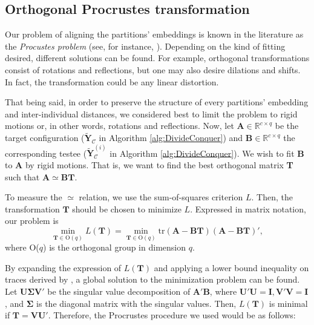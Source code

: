 \subsection{Orthogonal Procrustes transformation}
\label{sec:Procrustes}

Our problem of aligning the partitions' embeddings is known in the literature as the \textit{Procustes problem} (see, for instance, \citet{Borg2005}). Depending on the kind of fitting desired, different solutions can be found. For example, orthogonal transformations consist of rotations and reflections, but one may also desire dilations and shifts. In fact, the transformation could be any linear distortion.

That being said, in order to preserve the structure of every partitions' embedding and inter-individual distances, we considered best to limit the problem to rigid motions or, in other words, rotations and reflections. Now, let $\mathbf{A} \in \mathbb{R}^{c \times q}$ be the target configuration ($\mathbf{\tilde{Y}}_{\mathcal{C}}$ in Algorithm \ref{alg:DivideConquer}) and $\mathbf{B} \in \mathbb{R}^{c \times q}$ the corresponding testee ($\mathbf{\tilde{Y}}_{\mathcal{C}}^{(i)}$ in Algorithm \ref{alg:DivideConquer}). We wish to fit \textbf{B} to \textbf{A} by rigid motions. That is, we want to find the best orthogonal matrix \textbf{T} such that $\mathbf{A} \simeq \mathbf{BT}$.

To measure the $\simeq$ relation, we use the sum-of-squares criterion $L$. Then, the transformation $\mathbf{T}$ should be chosen to minimize $L$. Expressed in matrix notation, our problem is
$$
\min_{\mathbf{T} \in \text{O}(q)} L(\mathbf{T}) = \min_{\mathbf{T} \in \text{O}(q)} \text{tr}(\mathbf{A}-\mathbf{BT})(\mathbf{A}-\mathbf{BT})',
$$
where O($q$) is the orthogonal group in dimension $q$.

By expanding the expression of $L(\mathbf{T})$ and applying a lower bound inequality on traces derived by \citet{Kristof1970}, a global solution to the minimization problem can be found. Let $\mathbf{U}\boldsymbol{\Sigma}\mathbf{V}'$ be the singular value decomposition of $\mathbf{A}' \mathbf{B}$, where $\mathbf{U}' \mathbf{U}=\mathbf{I}, \mathbf{V}' \mathbf{V}=\mathbf{I}$, and $\boldsymbol{\Sigma}$ is the diagonal matrix with the singular values. Then, $L(\mathbf{T})$ is minimal if $\mathbf{T} = \mathbf{V} \mathbf{U}'$. Therefore, the Procrustes procedure we used would be as follows:

